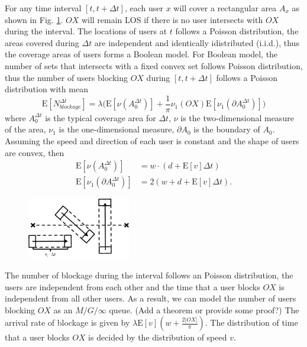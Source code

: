 \documentclass[10pt, conference, letterpaper]{IEEEtran}
\begin{document}
For any time interval $[t, t + \Delta t]$, each user $x$ will cover a rectangular area $A_x$ as shown in Fig. \ref{fig:constantvelocity}. ${OX}$ will remain LOS if there is no user intersects with ${OX}$ during the interval. The locations of users at $t$ follows a Poisson distribution, the areas covered during $\Delta t$ are independent and identically idistributed (i.i.d.), thus the coverage areas of users forms a Boolean model. For Boolean model, the number of sets that intersects with a fixed convex set follows Poisson distribution, thus the number of users blocking ${OX}$ during $[t, t+\Delta t]$ follows a Poisson distribution with mean
\begin{equation}
\mathrm{E}[N_{blockage}^{\Delta t}]=\lambda\big(\mathrm{E}[\nu(A_0^{\Delta t})] + \frac{1}{\pi}\nu_1({OX})\mathrm{E}[\nu_1(\partial A_0^{\Delta t})]\big)
\end{equation}
where $A_0^{\Delta t}$ is the typical coverage area for $\Delta t$, $\nu$ is the two-dimensional measure of the area, $\nu_1$ is the one-dimensional measure, $\partial A_0$ is the boundary of $A_0$. Assuming the speed and direction of each user is constant and the shape of users are convex, then 
\begin{equation*}
\begin{split}
\mathrm{E}[\nu(A_0^{\Delta t})] & = w\cdot (d + \mathrm{E}[v]\Delta t) \\
\mathrm{E}[\nu_1(\partial A_0^{\Delta t})] & = 2(w+d+\mathrm{E}[v] \Delta t).
\end{split}
\end{equation*}

\begin{figure}
	\centering
	\includegraphics[width = 0.4\textwidth]{constantvelocity.pdf}
	\label{fig:constantvelocity}
\end{figure}

The number of blockage during the interval follows an Poisson distribution, the users are independent from each other and the time that a user blocks $OX$ is independent from all other users. As a result, we can model the number of users blocking $OX$ as an $M/G/\infty$ queue. (Add a theorem or provide some proof?)
The arrival rate of blockage is given by $\lambda\mathrm{E}[v](w+\frac{2|OX|}{\pi})$. The distribution of time that a user blocks $OX$ is decided by the distribution of speed $v$.
\end{document}
